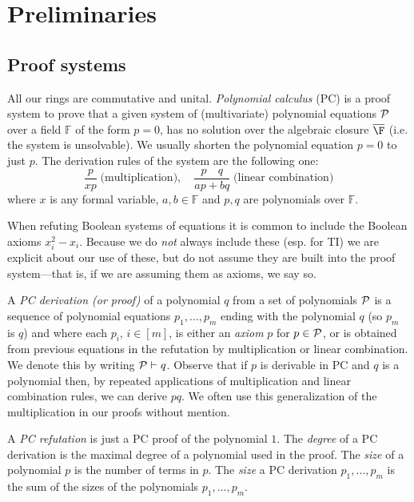 

\section{Preliminaries} \label{sec:prelim}


\subsection{Proof systems}
All our rings are commutative and unital. {\em Polynomial calculus} (PC) is a proof system to prove that a given system of (multivariate) polynomial equations ${\cal P}$ over a field $\mathbb F$ of the form $p=0$, has no solution over the algebraic closure $\overline{\F}$ (i.e. the system is unsolvable). We usually shorten the polynomial equation $p=0$ to just $p$.
The derivation rules of the system are the following one:
$$
\frac{p}{xp} \; \mbox{(multiplication)}, \quad \frac{p\quad q}{ap+bq} \; \mbox{(linear combination)} 
$$
where $x$ is any formal variable, $a,b \in \mathbb{F}$ and $p,q$ are polynomials over $\mathbb F$.  

When refuting Boolean systems of equations it is common to include the Boolean axioms $x_i^2 - x_i$. Because we do \emph{not} always include these (esp. for \textsc{TI}) we are explicit about our use of these, but do not assume they are built into the proof system---that is, if we are assuming them as axioms, we say so.

A {\em PC derivation (or proof)}  of a  polynomial $q$ from a set of polynomials ${\cal P}$ is a sequence of polynomial equations $p_1,\ldots, p_{m}$ ending with the polynomial $q$ (so $p_m$ is $q$) and where each $p_i$, $i \in [m]$, is either an {\em axiom} $p$ for $p \in  {\cal P}$, or is obtained from previous equations in the refutation by multiplication or linear combination.  We denote this by writing  ${\cal P}\vdash q$.  Observe that if $p$  is derivable in  PC and $q$ is a polynomial then, by repeated applications of multiplication and linear combination rules, we can derive
$pq$. We often use this generalization of the multiplication in our proofs without mention.  

A {\em PC refutation}  is just a PC proof  of the polynomial $1$.   The {\em degree} of a PC derivation is the maximal degree of a polynomial used in the proof. The {\em size} of a polynomial $p$ is the number of  terms in $p$.  The {\em size} a PC derivation $p_1,\ldots, p_m$  is the sum of the sizes of the polynomials $p_1,\ldots,  p_m$. 


